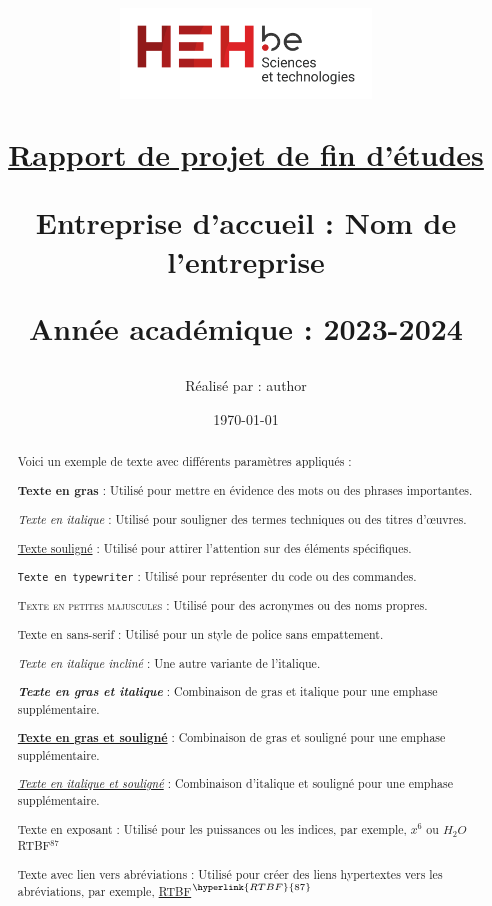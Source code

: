 \documentclass[a4paper, 12pt]{article}
\title{
    \begin{center}
        \includegraphics[width=0.5\textwidth]{img/logo_hehbe_tech.png}
    \end{center}
    \vspace{2cm}
    \begin{center}
        \underline{Rapport de projet de fin d'études}
    \end{center}
    \vspace{2cm}
    \begin{center}
        \fboxrule=0.3mm
        \fbox{
            \parbox{\textwidth}{
                \vspace{1cm}
                \centering
                \textbf{Titre du PFE Lorem ipsum dolor sit amet, consectetur adipiscing elit. Vivamus lacinia odio vitae}
                \vspace{1cm}
            }
        }
    \end{center}
    \vspace{2cm}
    \begin{center}
        \small Entreprise d'accueil : Nom de l'entreprise\\
    \end{center}
    \begin{center}
        \small Année académique : 2023-2024
    \end{center}
    \author{Réalisé par : author}
    \date{\today}

}
\begin{document}
\maketitle
\newpage
\begin{abstract}
    Voici un exemple de texte avec différents paramètres appliqués :
    
    \textbf{Texte en gras} : Utilisé pour mettre en évidence des mots ou des phrases importantes.
    
    \textit{Texte en italique} : Utilisé pour souligner des termes techniques ou des titres d'œuvres.
    
    \underline{Texte souligné} : Utilisé pour attirer l'attention sur des éléments spécifiques.
    
    \texttt{Texte en typewriter} : Utilisé pour représenter du code ou des commandes.
    
    \textsc{Texte en petites majuscules} : Utilisé pour des acronymes ou des noms propres.
    
    \textsf{Texte en sans-serif} : Utilisé pour un style de police sans empattement.
    
    \textsl{Texte en italique incliné} : Une autre variante de l'italique.
    
    \textbf{\textit{Texte en gras et italique}} : Combinaison de gras et italique pour une emphase supplémentaire.
    
    \textbf{\underline{Texte en gras et souligné}} : Combinaison de gras et souligné pour une emphase supplémentaire.
    
    \textit{\underline{Texte en italique et souligné}} : Combinaison d'italique et souligné pour une emphase supplémentaire.
    
    Texte en exposant : Utilisé pour les puissances ou les indices, par exemple, $x^6$ ou $H_2O$ RTBF$^{87}$
    
    Texte avec lien vers abréviations : Utilisé pour créer des liens hypertextes vers les abréviations, par exemple, \hyperlink{RTBF}{RTBF}$^{\hyperlink{RTBF}{87}}$

    
\end{abstract}

\newpage
\tableofcontents

\newpage
\newpage
\newpage
\end{document}

